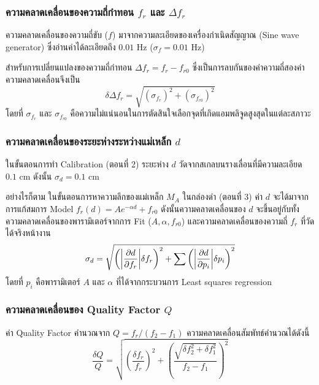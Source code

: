\documentclass[11pt,a4paper]{article}
\begin{document}
\subsubsection{ความคลาดเคลื่อนของความถี่กำทอน $f_r$ และ $\Delta f_r$}

ความคลาดเคลื่อนของความถี่ขับ ($f$) มาจากความละเอียดของเครื่องกำเนิดสัญญาณ (Sine wave generator) ซึ่งอ่านค่าได้ละเอียดถึง $0.01$ Hz ($\sigma_f = 0.01$ Hz) 

สำหรับการเปลี่ยนแปลงของความถี่กำทอน $\Delta f_r = f_r - f_{r0}$ ซึ่งเป็นการลบกันของค่าความถี่สองค่า ความคลาดเคลื่อนจึงเป็น
\[
\delta \Delta f_r = \sqrt{(\sigma_{f_r})^2 + (\sigma_{f_{r0}})^2}
\]
โดยที่ $\sigma_{f_r}$ และ $\sigma_{f_{r0}}$ คือความไม่แน่นอนในการตัดสินใจเลือกจุดที่เกิดแอมพลิจูดสูงสุดในแต่ละสภาวะ

\subsubsection{ความคลาดเคลื่อนของระยะห่างระหว่างแม่เหล็ก $d$}

ในขั้นตอนการทำ Calibration (ตอนที่ 2) ระยะห่าง $d$ วัดจากสเกลบนรางเลื่อนที่มีความละเอียด $0.1$ cm ดังนั้น $\sigma_d = 0.1$ cm 

อย่างไรก็ตาม ในขั้นตอนการหาความลึกของแม่เหล็ก $M_A$ ในกล่องดำ (ตอนที่ 3) ค่า $d$ จะได้มาจากการแก้สมการ Model $f_r(d) = A e^{-\alpha d} + f_{r0}$ ดังนั้นความคลาดเคลื่อนของ $d$ จะขึ้นอยู่กับทั้งความคลาดเคลื่อนของพารามิเตอร์จากการ Fit ($A, \alpha, f_{r0}$) และความคลาดเคลื่อนของความถี่ $f_r$ ที่วัดได้จริงหน้างาน
\[
\sigma_{d} = \sqrt{ \left( \abs{\frac{\partial d}{\partial f_r}} \delta f_r \right)^2 + \sum \left( \abs{\frac{\partial d}{\partial p_i}} \delta p_i \right)^2 }
\]
โดยที่ $p_i$ คือพารามิเตอร์ $A$ และ $\alpha$ ที่ได้จากกระบวนการ Least squares regression

\subsubsection{ความคลาดเคลื่อนของ Quality Factor $Q$}

ค่า Quality Factor คำนวณจาก $Q = f_r / (f_2 - f_1)$ ความคลาดเคลื่อนสัมพัทธ์คำนวณได้ดังนี้
\[
\frac{\delta Q}{Q} = \sqrt{ \left( \frac{\delta f_r}{f_r} \right)^2 + \left( \frac{\sqrt{\delta f_2^2 + \delta f_1^2}}{f_2 - f_1} \right)^2 }
\]







\end{document}
